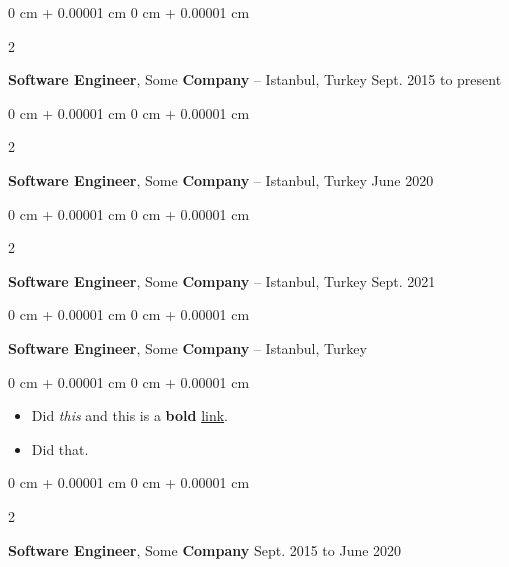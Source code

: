 \documentclass[10pt, letterpaper]{article}
\newenvironment{highlights}{
    \begin{itemize}[
        topsep=0.10 cm,
        parsep=0.10 cm,
        partopsep=0pt,
        itemsep=0pt,
        leftmargin=0 cm + 10pt
    ]
}{
    \end{itemize}
} %
\newenvironment{onecolentry}{
    \begin{adjustwidth}{
        0 cm + 0.00001 cm
    }{
        0 cm + 0.00001 cm
    }
}{
    \end{adjustwidth}
} %
\newenvironment{twocolentry}[2][]{
    \onecolentry
    \def\secondColumn{#2}
    \setcolumnwidth{\fill, 4.5 cm}
    \begin{paracol}{2}
}{
    \switchcolumn \raggedleft \secondColumn
    \end{paracol}
    \endonecolentry
} %
\begin{document}
        \vspace{0.2 cm}

        \begin{twocolentry}{
            Sept. 2015 to present
        }
            \textbf{Software Engineer}, Some \textbf{Company} -- Istanbul, Turkey\end{twocolentry}



        \vspace{0.2 cm}

        \begin{twocolentry}{
            June 2020
        }
            \textbf{Software Engineer}, Some \textbf{Company} -- Istanbul, Turkey\end{twocolentry}



        \vspace{0.2 cm}

        \begin{twocolentry}{
            Sept. 2021
        }
            \textbf{Software Engineer}, Some \textbf{Company} -- Istanbul, Turkey\end{twocolentry}



        \vspace{0.2 cm}

        \begin{onecolentry}
            \textbf{Software Engineer}, Some \textbf{Company} -- Istanbul, Turkey\end{onecolentry}

        \vspace{0.10 cm}
        \begin{onecolentry}
            \begin{highlights}
                \item Did \textit{this} and this is a \textbf{bold} \href{https://example.com}{link}.
                \item Did that.
            \end{highlights}
        \end{onecolentry}


        \vspace{0.2 cm}

        \begin{twocolentry}{
            Sept. 2015 to June 2020
        }
            \textbf{Software Engineer}, Some \textbf{Company}\end{twocolentry}
\end{document}
